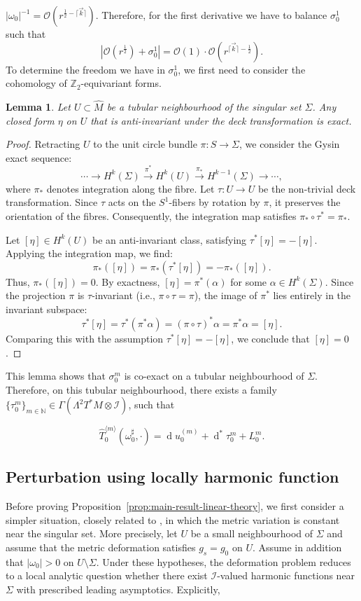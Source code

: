 \documentclass[11pt]{amsart}
\newcommand{\Z}{\mathbb{Z}}
\newcommand{\N}{\mathbb{N}}
\renewcommand{\d}{\operatorname{d}}
\renewcommand{\O}{\mathcal{O}}
\newtheorem{lemma}[theorem]{Lemma}
\begin{document}
$
|\omega_0|^{-1} = \O\left(r^{\frac12-\lceil\vec{k}\rceil}\right).
$
Therefore, for the first derivative we have to balance $\sigma^1_0$ such that 
$$
\left|\O(r^{\frac12}) + \sigma^{1}_0 \right| = \O(1)\cdot \O\left(r^{\lceil\vec{k}\rceil-\frac12}\right).
$$
To determine the freedom we have in $\sigma^1_0$, we first need to consider the cohomology of $\Z_2$-equivariant forms.
\begin{lemma}
	\label{lem:Z2-equivariant-closed-forms-are-exact-near-Sigma}
	Let $U \subset \widehat{M}$ be a tubular neighbourhood of the singular set $\Sigma$. Any closed form $\eta$ on $U$ that is anti-invariant under the deck transformation is exact.
\end{lemma}
\begin{proof}
	Retracting $U$ to the unit circle bundle $\pi: S \to \Sigma$, we consider the Gysin exact sequence:
	\[
	\cdots \longrightarrow H^k(\Sigma) \xrightarrow{\pi^*} H^k(U) \xrightarrow{\pi_*} H^{k-1}(\Sigma) \longrightarrow \cdots,
	\]
	where $\pi_*$ denotes integration along the fibre. Let $\tau: U \to U$ be the non-trivial deck transformation. Since $\tau$ acts on the $S^1$-fibers by rotation by $\pi$, it preserves the orientation of the fibres. Consequently, the integration map satisfies $\pi_* \circ \tau^* = \pi_*$.
	
	Let $[\eta] \in H^k(U)$ be an anti-invariant class, satisfying $\tau^*[\eta] = -[\eta]$. Applying the integration map, we find:
	\[
	\pi_*([\eta]) = \pi_*(\tau^*[\eta]) = -\pi_*([\eta]).
	\]
	Thus, $\pi_*([\eta]) = 0$. By exactness, $[\eta] = \pi^*(\alpha)$ for some $\alpha \in H^k(\Sigma)$. Since the projection $\pi$ is $\tau$-invariant (i.e., $\pi \circ \tau = \pi$), the image of $\pi^*$ lies entirely in the invariant subspace:
	\[
	\tau^*[\eta] = \tau^*(\pi^*\alpha) = (\pi \circ \tau)^*\alpha = \pi^*\alpha = [\eta].
	\]
	Comparing this with the assumption $\tau^*[\eta] = -[\eta]$, we conclude that $[\eta] = 0$.
\end{proof}
This lemma shows that $\sigma^m_0$ is co-exact on a tubular neighbourhood of $\Sigma$. Therefore, on this tubular neighbourhood, there exists a family $\{\tau^m_0\}_{m \in \N} \in \Gamma(\Lambda^2 T^*M \otimes \mathcal{I})$, such that

$$
\widehat T^{\langle m\rangle}_0(\omega_0^\sharp,\cdot) = \d u_0^{(m)} + \d^* \!\tau^{ m }_0 + L^m_0.
$$

\subsection{Perturbation using locally harmonic function}
Before proving Proposition~\ref{prop:main-result-linear-theory}, we first consider a simpler situation, closely related to \cite{Parker2022concentrating}, in which the metric variation is constant near the singular set. More precisely, let \(U\) be a small
neighbourhood of \(\Sigma\) and assume that the metric deformation satisfies \(g_s=g_0\) on \(U\).
Assume in addition that \(|\omega_0|>0\) on \(U\setminus\Sigma\). Under these hypotheses, the
deformation problem reduces to a local analytic question whether there exist
\(\mathcal I\)-valued harmonic functions near \(\Sigma\) with prescribed leading asymptotics. Explicitly, 
\end{document}
